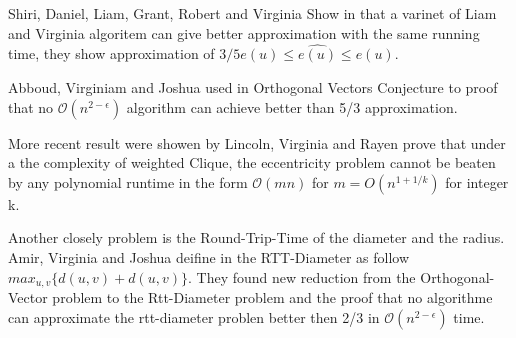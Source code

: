 Shiri, Daniel, Liam, Grant, Robert and Virginia 
Show in \cite{SDLLGREV2000} that a varinet of Liam and Virginia algoritem \cite{LV2013} can give better approximation with the same running time, they show approximation of $3/5e(u)\leq \hat{e(u)} \leq e(u)$.




Abboud, Virginiam and Joshua \cite{AVJ2016} used in Orthogonal Vectors Conjecture to proof that no $\mathcal{O}(n^{2-\epsilon})$ algorithm can achieve better than 5/3 approximation.

More recent result were showen by Lincoln, Virginia and Rayen \cite{AVR2018} prove that under a the complexity of weighted Clique, the eccentricity problem cannot be beaten by any polynomial runtime in the form $\mathcal{O}(mn)$
for $m=O(n^{1+1/k})$ for integer k.


Another closely problem is the Round-Trip-Time of the diameter and the radius. Amir, Virginia and Joshua deifine in \cite{AVJ2016} the RTT-Diameter as follow $max_{u,v}\{d(u,v)+d(u,v)\}$. They found new reduction from the Orthogonal-Vector problem to the Rtt-Diameter problem and the proof that no algorithme can approximate the rtt-diameter problen better then 2/3 in $\mathcal{O}(n^{2-\epsilon})$ time.